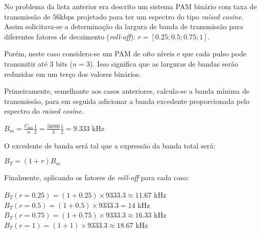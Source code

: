 No problema da lista anterior era descrito um sistema PAM binário com taxa de transmissão de $56$kbps projetado para ter um espectro do tipo \textit{raised cosine}. Assim solicitava-se a determinação da largura de banda de transmissão para diferentes fatores de decaimento (\textit{roll-off}): $r = [0.25; 0.5; 0.75; 1]$.

Porém, neste caso considera-se um PAM de oito níveis e que cada pulso pode transmitir até 3 bits ($n=3$). Isso significa que as larguras de bandas serão reduzidas em um terço dos valores binários.

Primeiramente, semelhante aos casos anteriores, calcula-se a banda mínima de transmissão, para em seguida adicionar a banda excedente proporcionada pelo espectro do \textit{raised cosine}.
\begin{center}
    $B_m = \frac{C_{bin}}{n}\frac{1}{2} =  \frac{56000}{3}\frac{1}{2}= 9.333$ kHz
\end{center}
O excedente de banda será tal que a expressão da banda total será:
\begin{center}
    $B_T = (1+r)B_m $ 
\end{center}
Finalmente, aplicando os fatores de \textit{roll-off} para cada caso:

\begin{center}
    $B_T(r=0.25) = (1+0.25) \times 9333.3 \approx 11.67$ kHz \\ \vspace{1pt}
    $B_T(r=0.5) = (1+0.5) \times 9333.3 = 14$ kHz \\ \vspace{1pt}
    $B_T(r=0.75) = (1+0.75) \times 9333.3 \approx 16.33 $ kHz \\ \vspace{1pt}
    $B_T(r=1) = (1+1) \times 9333.3 \approx 18.67 $ kHz \\ \vspace{1pt}
\end{center}
\newpage